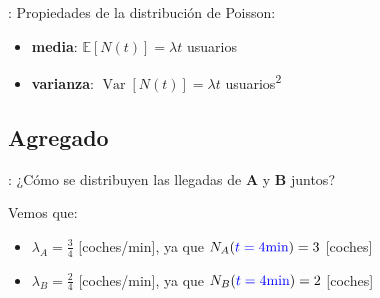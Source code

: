 \documentclass[xcolor={x11names}]{beamer}
\DeclareMathOperator{\Var}{Var}
\newcommand{\blue}[1]{{\color{blue}#1}}
\begin{document}
\begin{frame}{\secname: \subsecname}
    Propiedades de la distribución de Poisson:
    \begin{itemize}
        \item \textbf{media}: $\mathbb{E}[N(t)]=\lambda t$ usuarios
        \item \textbf{varianza}: $\Var[N(t)]=\lambda t$ usuarios\textsuperscript{2}
    \end{itemize}

    \begin{figure}
        
    \end{figure}
\end{frame}




\subsection{Agregado}
\begin{frame}{\secname: \subsecname}
    ¿Cómo se distribuyen las llegadas
    de \textbf{\color{Firebrick1}A} y
    \textbf{\color{Firebrick4}B} juntos?

    \begin{figure}
        
    \end{figure}

    Vemos que:
    \begin{itemize}
        \item {\color{Firebrick1}$\lambda_A=\tfrac{3}{4}$} [coches/min], ya que {\color{HotPink1}$N_A(\blue{t=4\text{min}})=3$} [coches]
        \item {\color{Firebrick4}$\lambda_B=\tfrac{2}{4}$} [coches/min], ya que {\color{HotPink4}$N_B(\blue{t=4\text{min}})=2$} [coches]
    \end{itemize}

\end{frame}
\end{document}
